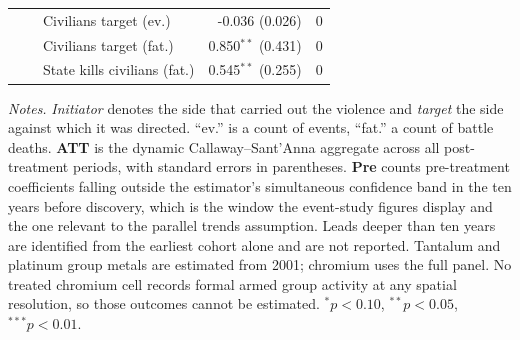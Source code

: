 \begin{table}[H]
\begin{tabular}{lllrr}
 &  & Civilians target (ev.) & -0.036 (0.026) & 0 \\
 &  & Civilians target (fat.) & 0.850$^{**}$ (0.431) & 0 \\
 &  & State kills civilians (fat.) & 0.545$^{**}$ (0.255) & 0 \\
\bottomrule
\end{tabular}
\begin{minipage}{0.95\textwidth}\vspace{4pt}\scriptsize
\textit{Notes.} \textit{Initiator} denotes the side that carried out the violence and \textit{target} the side against which it was directed. ``ev.'' is a count of events, ``fat.'' a count of battle deaths. \textbf{ATT} is the dynamic Callaway--Sant'Anna aggregate across all post-treatment periods, with standard errors in parentheses. \textbf{Pre} counts pre-treatment coefficients falling outside the estimator's simultaneous confidence band in the ten years before discovery, which is the window the event-study figures display and the one relevant to the parallel trends assumption. Leads deeper than ten years are identified from the earliest cohort alone and are not reported. Tantalum and platinum group metals are estimated from 2001; chromium uses the full panel. No treated chromium cell records formal armed group activity at any spatial resolution, so those outcomes cannot be estimated. $^{*}p<0.10$, $^{**}p<0.05$, $^{***}p<0.01$.
\end{minipage}
\end{table}
